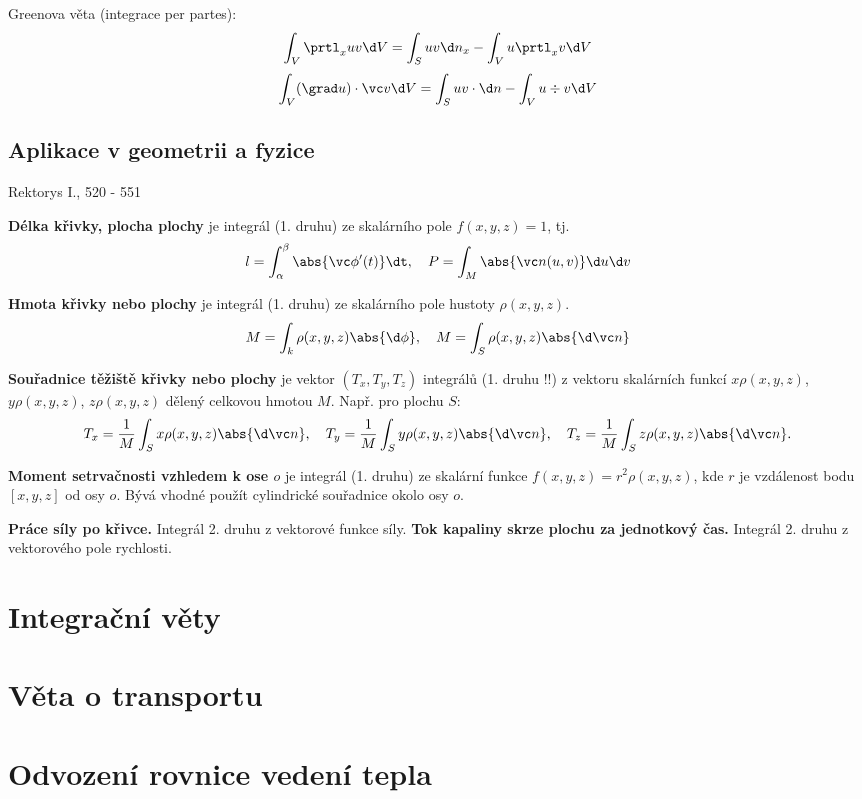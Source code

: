 Greenova věta (integrace per partes):
\[
        \int_V  \prtl_x u  v \d V = \int_S u v  \d n_x - \int_V u \prtl_x v \d V
\]
\[
        \int_V (\grad u) \cdot \vc v \d V = \int_S u v \cdot \d n - \int_V u \div v \d V
\]


\subsection{Aplikace v geometrii a fyzice}
Rektorys I., 520 - 551

{\bf Délka křivky, plocha plochy} je integrál (1. druhu) ze skalárního pole $f(x,y,z)=1$, tj.
\[
   l=\int_\alpha^\beta \abs{\vc \phi'(t)} \dt,\quad 
   P=\int_M \abs{\vc n(u,v)} \d u\d v
\]

{\bf Hmota křivky nebo plochy} je integrál (1. druhu) ze skalárního pole hustoty $\rho(x,y,z)$.
\[
        M=\int_k \rho(x,y,z) \abs{\d \phi},\quad M=\int_S \rho(x,y,z) \abs{\d \vc n}
\]

{\bf Souřadnice těžiště křivky nebo plochy} je vektor $(T_x,T_y,T_z)$ integrálů (1. druhu !!) z vektoru skalárních funkcí $ x \rho(x,y,z)$, $ y \rho(x,y,z)$, $z\rho(x,y,z)$ dělený celkovou hmotou $M$. Např. pro plochu $S$:
\[
        T_x=\frac{1}{M}\int_S x\rho(x,y,z) \abs{\d \vc n},\quad
        T_y=\frac{1}{M}\int_S y\rho(x,y,z) \abs{\d \vc n},\quad
        T_z=\frac{1}{M}\int_S z\rho(x,y,z) \abs{\d \vc n}.
\]

{\bf Moment setrvačnosti vzhledem k ose $o$} je integrál (1. druhu) ze skalární funkce
$f(x,y,z)=r^2\rho(x,y,z)$, kde $r$ je vzdálenost bodu $[x,y,z]$ od osy $o$. Bývá vhodné 
použít cylindrické souřadnice okolo osy $o$. 

{\bf Práce síly po křivce.} Integrál 2. druhu z vektorové funkce síly.
{\bf Tok kapaliny skrze plochu za jednotkový čas.} Integrál 2. druhu z vektorového pole rychlosti.

\section{Integrační věty}

\section{Věta o transportu}

\section{Odvození rovnice vedení tepla}